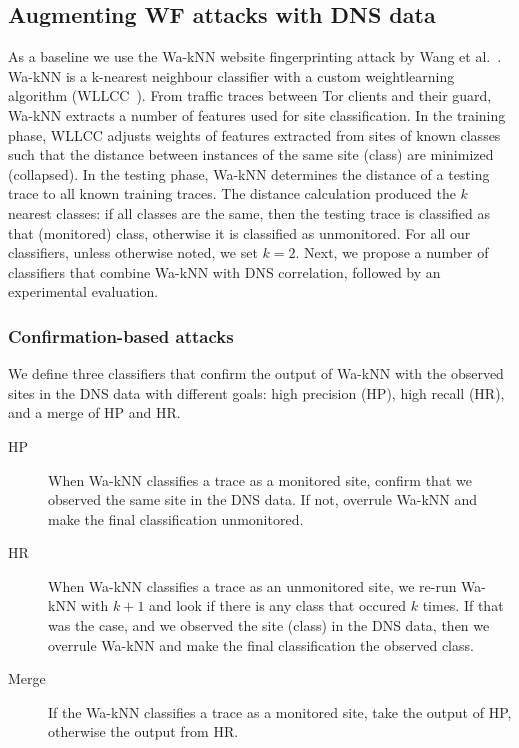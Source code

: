 \subsection{Augmenting WF attacks with DNS data}
As a baseline we use the Wa-kNN website fingerprinting attack by
Wang et al.~\cite{Wang2014a}. Wa-kNN is a k-nearest neighbour classifier with
a custom weightlearning algorithm (WLLCC~\cite{WangThesis}). From traffic traces
between Tor clients and their guard, Wa-kNN extracts a number of features used
for site classification.
In the training phase, WLLCC adjusts weights of features extracted from sites
of known classes such that the distance between instances of the same site (class) are minimized (collapsed).
In the testing phase, Wa-kNN determines the distance of a testing trace to all
known training traces. The distance calculation produced the $k$ nearest
classes: if all classes are the same, then the testing trace is classified as
that (monitored) class, otherwise it is classified as unmonitored.
For all our classifiers, unless otherwise noted, we set $k=2$. Next, we propose
a number of classifiers that combine Wa-kNN with DNS correlation, followed by
an experimental evaluation.

\subsubsection{Confirmation-based attacks}
We define three classifiers that confirm the output of Wa-kNN with the observed
sites in the DNS data with different goals: high precision (HP), high
 recall (HR), and a merge of HP and HR.

 \begin{description}
 	\item[HP] When Wa-kNN classifies a trace as a monitored site, confirm
	that we observed the same site in the DNS data. If not, overrule Wa-kNN and
	make the final classification unmonitored.
	\item[HR] When Wa-kNN classifies a trace as an unmonitored site, we re-run
	Wa-kNN with $k+1$ and look if there is any class that occured $k$ times.
	If that was the case, and we observed the site (class) in the DNS data,
	then we overrule Wa-kNN and make the final classification the observed class.
	\item[Merge] If the Wa-kNN classifies a trace as a monitored site, take the
	output of HP, otherwise the output from HR.
 \end{description}

